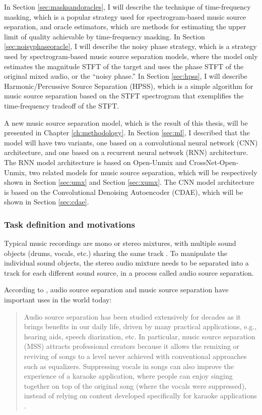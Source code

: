 \documentclass[report.tex]{subfiles}
\begin{document}
In Section \ref{sec:masksandoracles}, I will describe the technique of time-frequency masking, which is a popular strategy used for spectrogram-based music source separation, and oracle estimators, which are methods for estimating the upper limit of quality achievable by time-frequency masking. In Section \ref{sec:noisyphaseoracle}, I will describe the noisy phase strategy, which is a strategy used by spectrogram-based music source separation models, where the model only estimates the magnitude STFT of the target and uses the phase STFT of the original mixed audio, or the ``noisy phase.'' In Section \ref{sec:hpss}, I will describe Harmonic/Percussive Source Separation (HPSS), which is a simple algorithm for music source separation based on the STFT spectrogram that exemplifies the time-frequency tradeoff of the STFT. 

A new music source separation model, which is the result of this thesis, will be presented in Chapter \ref{ch:methodology}. In Section \ref{sec:ml}, I described that the model will have two variants, one based on a convolutional neural network (CNN) architecture, and one based on a recurrent neural network (RNN) architecture. The RNN model architecture is based on Open-Unmix and CrossNet-Open-Unmix, two related models for music source separation, which will be respectively shown in Section \ref{sec:umx} and Section \ref{sec:xumx}. The CNN model architecture is based on the Convolutional Denoising Autoencoder (CDAE), which will be shown in Section \ref{sec:cdae}.

\subsubsection{Task definition and motivations}
\label{sec:musicsepdefsmotivations}

Typical music recordings are mono or stereo mixtures, with multiple sound objects (drums, vocals, etc.) sharing the same track \parencite{musicsepintro1}. To manipulate the individual sound objects, the stereo audio mixture needs to be separated into a track for each different sound source, in a process called audio source separation.

According to \citeauthor{mdx21}, audio source separation and music source separation have important uses in the world today:
\begin{quote}
	Audio source separation has been studied extensively for decades as it brings benefits in our daily life, driven by many practical applications, e.g., hearing aids, speech diarization, etc. In particular, music source separation (MSS) attracts professional creators because it allows the remixing or reviving of songs to a level never achieved with conventional approaches such as equalizers. Suppressing vocals in songs can also improve the experience of a karaoke application, where people can enjoy singing together on top of the original song (where the vocals were suppressed), instead of relying on content developed specifically for karaoke applications \parencite[1]{mdx21}.
\end{quote}
\end{document}
